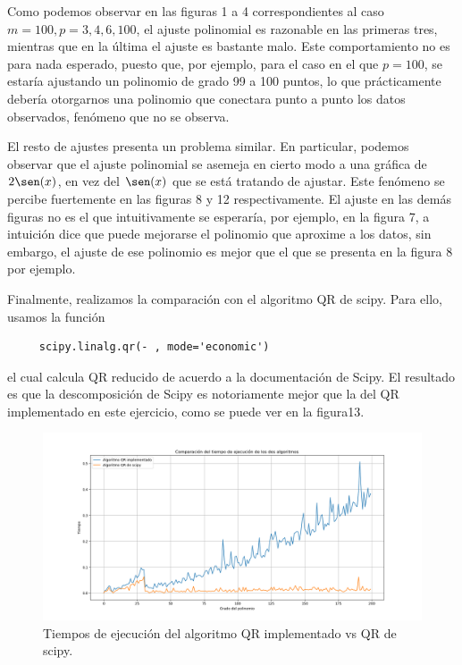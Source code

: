 \documentclass[letterpaper]{article}
\newcommand{\1}{\mathds{1}}
\theoremstyle{definition}
\theoremstyle{definition}
\theoremstyle{definition}
\theoremstyle{definition}
\theoremstyle{definition}
\begin{document}
\begin{enumerate}
\begin{figure}[h]
        \caption{}
    \end{figure}  
    Como podemos observar en las figuras 1 a 4 correspondientes al caso $m=100, p=3,4,6,100$,
    el ajuste polinomial es razonable en las primeras tres, mientras que en la última el
    ajuste es bastante malo. Este comportamiento no es para nada esperado, puesto que, por
    ejemplo, para el caso en el que $p=100$, se estaría ajustando un polinomio de grado
    99 a 100 puntos, lo que prácticamente debería otorgarnos una polinomio que conectara
    punto a punto los datos observados, fenómeno que no se observa.
     \newline

     El resto de ajustes presenta un problema similar. En particular, podemos observar
     que el ajuste polinomial se asemeja en cierto modo a una gráfica de $2\sen(x)$, en
     vez del $\sen(x)$ que se está tratando de ajustar. Este fenómeno se percibe fuertemente
     en las figuras 8 y 12 respectivamente. El ajuste en las demás figuras no es el que
     intuitivamente se esperaría, por ejemplo, en la figura 7, a intuición dice que puede
     mejorarse el polinomio que aproxime a los datos, sin embargo, el ajuste de ese polinomio
     es mejor que el que se presenta en la figura 8 por ejemplo.
     \newline

     Finalmente, realizamos la comparación con el algoritmo QR de scipy. Para ello, usamos
     la función 
     \begin{lstlisting}
     scipy.linalg.qr(- , mode='economic')   
     \end{lstlisting}
     el cual calcula QR reducido de acuerdo a la documentación de Scipy. El resultado es que
     la descomposición de Scipy es notoriamente mejor que la del QR implementado en este ejercicio,
     como se puede ver en la figura13.
     \begin{figure}[h]
        \centering
        \includegraphics[width=\linewidth]{13.png}
        \caption{Tiempos de ejecución del algoritmo QR implementado vs QR de scipy.}
    \end{figure}


\end{enumerate}
\end{document}
